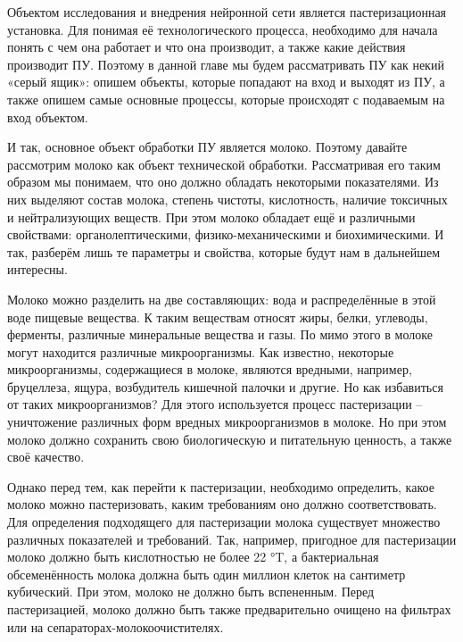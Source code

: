 {\cyrillicfont %
\fontsize{13pt}{16.25pt}\selectfont %
\setlength{\parindent}{1.25cm} %
\englishfont %

  \par Объектом исследования и внедрения нейронной сети является пастеризационная установка. Для понимая её технологического процесса, необходимо для начала понять с чем она работает и что она производит, а также какие действия производит ПУ. Поэтому в данной главе мы будем рассматривать ПУ как некий «серый ящик»: опишем объекты, которые попадают на вход и выходят из ПУ, а также опишем самые основные процессы, которые происходят с подаваемым на вход объектом. 

  \par И так, основное объект обработки ПУ является молоко. Поэтому давайте рассмотрим молоко как объект технической обработки. Рассматривая его таким образом мы понимаем, что оно должно обладать некоторыми показателями. Из них выделяют состав молока, степень чистоты, кислотность, наличие токсичных и нейтрализующих веществ. При этом молоко обладает ещё и различными свойствами: органолептическими, физико-механическими и биохимическими. И так, разберём лишь те параметры и свойства, которые будут нам в дальнейшем интересны.

  \par Молоко можно разделить на две составляющих: вода и распределённые в этой воде пищевые вещества. К таким веществам относят жиры, белки, углеводы, ферменты, различные минеральные вещества и газы. По мимо этого в молоке могут находится различные микроорганизмы. Как известно, некоторые микроорганизмы, содержащиеся в молоке, являются вредными, например, бруцеллеза, ящура, возбудитель кишечной палочки и другие. Но как избавиться от таких микроорганизмов?  Для этого используется процесс пастеризации – уничтожение различных форм вредных микроорганизмов в молоке. Но при этом молоко должно сохранить свою биологическую и питательную ценность, а также своё качество. 

  \par Однако перед тем, как перейти к пастеризации, необходимо определить, какое молоко можно пастеризовать, каким требованиям оно должно соответствовать. Для определения подходящего для пастеризации молока существует множество различных показателей и требований. Так, например, пригодное для пастеризации молоко должно быть кислотностью не более 22 °T, а бактериальная обсеменённость молока должна быть один миллион клеток на сантиметр кубический. При этом, молоко не должно быть вспененным. Перед пастеризацией, молоко должно быть также предварительно очищено на фильтрах или на сепараторах-молокоочистителях. 

}
